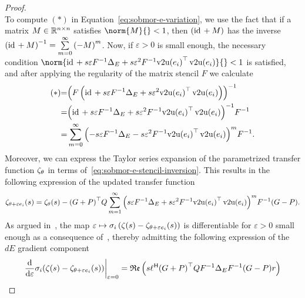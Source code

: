 \begin{proof}
\begin{equation}
    \end{equation}
    To compute $(*)$ in Equation~\eqref{eq:sobmor-e-variation}, we use the fact that if a matrix $M \in \mathbb{R}^{n \times n}$ satisfies $\norm{M}{} < 1$, then $(\text{id}_{\mkern2mu } + M)$ has the inverse ${(\id + M)}\inv = \sum\limits_{m = 0}^\infty {(-M)}^m$.
    Now, if $\varepsilon > 0$ is small enough, the necessary condition $\norm{\id + s \varepsilon F\inv \Delta_E + s \varepsilon^2 F\inv {\vecupper(e_i)}\trans \vecupper(e_i)}{} < 1$ is satisfied, and after applying the regularity of the matrix stencil $F$ we calculate
    \begin{equation}\label{eq:sobmor-e-stencil-inversion}
        \begin{alignedat}{3}
            &(*) &= &{\left( F \left( \id + s \varepsilon F\inv \Delta_E + s \varepsilon^2 {\vecupper(e_i)}\trans \vecupper(e_i) \right) \right)}\inv \\
            & &= &{\left( \id + s \varepsilon F\inv \Delta_E + s \varepsilon^2 F\inv {\vecupper(e_i)}\trans \vecupper(e_i) \right)}\inv F\inv \\
            & &= &\sum\limits_{m = 0}^\infty {\left( - s \varepsilon F\inv \Delta_E - s \varepsilon^2 F\inv {\vecupper(e_i)}\trans \vecupper(e_i) \right)}^m F\inv.
        \end{alignedat}
    \end{equation}
    Moreover, we can express the Taylor series expansion of the parametrized transfer function $\zeta_\theta$ in terms of~\eqref{eq:sobmor-e-stencil-inversion}.
    This results in the following expression of the updated transfer function
    \begin{equation}\label{eq:sobmor-e-taylor}
        \tfunc_{\theta + \varepsilon e_i}(s) = \tfunc_\theta(s) - {(G + P)}\trans Q \sum\limits_{m = 1}^\infty {\left( s \varepsilon F\inv \Delta_E + s \varepsilon^2 F\inv {\vecupper(e_i)}\trans \vecupper(e_i) \right)}^m F\inv (G - P).
    \end{equation}
    As argued in~\cite[Theorem~1]{Schwerdtner2023}, the map $\varepsilon \mapsto \sigma_i\left( \zeta(s) - \zeta_{\theta + \varepsilon e_i}(s) \right)$ is differentiable for $\varepsilon > 0$ small enough as a consequence of~\cite{Lancaster1964}, thereby admitting the following expression of the $dE$ gradient component
    \begin{equation}\label{eq:sobmor-e-trace-form}
        \begin{aligned}
            \res{\frac{\dif}{\dif \varepsilon} \sigma_i(\tfunc(s) - \tfunc_{\theta + \varepsilon e_i}(s))}{\varepsilon = 0} &= \re{s \ell\herm {(G + P)}\trans Q F\inv \Delta_E F\inv (G - P) r} \\

\end{aligned}
\end{equation}
\end{proof}
